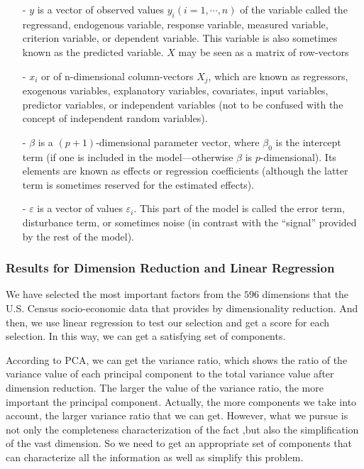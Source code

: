 \documentclass{mcmthesis}
\begin{document}
\begin{itemize}
\item[-] $y$ is a vector of observed values $y_{i} ( i = 1, \cdots, n )$ of the variable called the regressand, endogenous variable, response variable, measured variable, criterion variable, or dependent variable. This variable is also sometimes known as the predicted variable. $X$ may be seen as a matrix of row-vectors 
\item[-] $x_{i}$ or of n-dimensional column-vectors $X_{j}$, which are known as regressors, exogenous variables, explanatory variables, covariates, input variables, predictor variables, or independent variables (not to be confused with the concept of independent random variables).
 \item[-] $\beta$ is a $( p + 1 )$-dimensional parameter vector, where $\beta _{0}$ is the intercept term (if one is included in the model—otherwise $\beta$ is $p$-dimensional). Its elements are known as effects or regression coefficients (although the latter term is sometimes reserved for the estimated effects).
\item[-] $\varepsilon$ is a vector of values $\varepsilon _{i}$. This part of the model is called the error term, disturbance term, or sometimes noise (in contrast with the ``signal'' provided by the rest of the model).

\end{itemize}

\subsubsection{Results for Dimension Reduction and Linear Regression}\label{sec:DRLR}

We have selected the most important factors from the $596$ dimensions that the U.S. Census socio-economic data that provides by dimensionality reduction. And then, we use linear regression to test our selection and get a score for each selection. In this way, we can get a satisfying set of components. 

According to PCA, we can get the variance ratio, which shows the ratio of the variance value of each principal component to the total variance value after dimension reduction. The larger the value of the variance ratio, the more important the principal component. Actually, the more components we take into account, the larger variance ratio that we can get. However, what we pursue is not only the completeness characterization of the fact ,but also the simplification of the vast dimension. So we need to get an appropriate set of components that can characterize all the information as well as simplify this problem.
\end{document}
